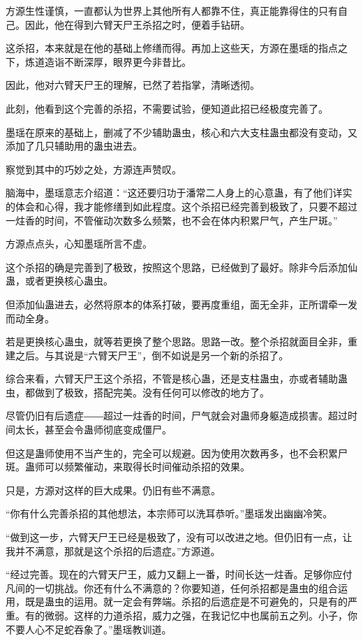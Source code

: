 
\begin{this_body}

方源生性谨慎，一直都认为世界上其他所有人都靠不住，真正能靠得住的只有自己。因此，他在得到六臂天尸王杀招之时，便着手钻研。

这杀招，本来就是在他的基础上修缮而得。再加上这些天，方源在墨瑶的指点之下，炼道造诣不断深厚，眼界更今非昔比。

因此，他对六臂天尸王的理解，已然了若指掌，清晰透彻。

此刻，他看到这个完善的杀招，不需要试验，便知道此招已经极度完善了。

墨瑶在原来的基础上，删减了不少辅助蛊虫，核心和六大支柱蛊虫都没有变动，又添加了几只辅助用的蛊虫进去。

察觉到其中的巧妙之处，方源连声赞叹。

脑海中，墨瑶意志介绍道：“这还要归功于潘常二人身上的心意蛊，有了他们详实的体会和心得，我才能修缮到如此程度。这个杀招已经完善到极致了，只要不超过一炷香的时间，不管催动次数多么频繁，也不会在体内积累尸气，产生尸斑。”

方源点点头，心知墨瑶所言不虚。

这个杀招的确是完善到了极致，按照这个思路，已经做到了最好。除非今后添加仙蛊，或者更换核心蛊虫。

但添加仙蛊进去，必然将原本的体系打破，要再度重组，面无全非，正所谓牵一发而动全身。

若是更换核心蛊虫，就等若更换了整个思路。思路一改。整个杀招就面目全非，重建之后。与其说是“六臂天尸王”，倒不如说是另一个新的杀招了。

综合来看，六臂天尸王这个杀招，不管是核心蛊，还是支柱蛊虫，亦或者辅助蛊虫，都做到了极致，搭配完美。没有任何可以修改的地方了。

尽管仍旧有后遗症――超过一炷香的时间，尸气就会对蛊师身躯造成损害。超过时间太长，甚至会令蛊师彻底变成僵尸。

但这是蛊师使用不当产生的，完全可以规避。因为使用次数再多，也不会积累尸斑。蛊师可以频繁催动，来取得长时间催动杀招的效果。

只是，方源对这样的巨大成果。仍旧有些不满意。

“你有什么完善杀招的其他想法，本宗师可以洗耳恭听。”墨瑶发出幽幽冷笑。

“做到这一步，六臂天尸王已经是极致了，没有可以改进之地。但仍旧有一点，让我并不满意，那就是这个杀招的后遗症。”方源道。

“经过完善。现在的六臂天尸王，威力又翻上一番，时间长达一炷香。足够你应付凡间的一切挑战。你还有什么不满意的？你要知道，任何杀招都是蛊虫的组合运用，既是蛊虫的运用。就一定会有弊端。杀招的后遗症是不可避免的，只是有的严重。有的微弱。这样的力道杀招，威力之强，在我记忆中也属前五之列。小子，你不要人心不足蛇吞象了。”墨瑶教训道。


\end{this_body}
